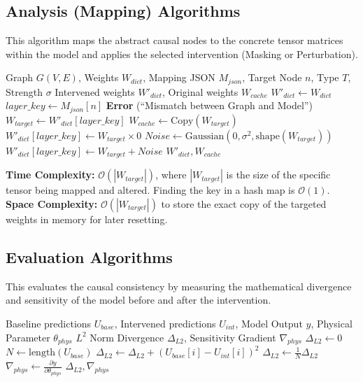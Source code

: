 \documentclass[12pt,singleside,a4paper]{article}
\begin{document}
\subsection{Analysis (Mapping) Algorithms}
This algorithm maps the abstract causal nodes to the concrete tensor matrices within the model and applies the selected intervention (Masking or Perturbation).

\begin{algorithm}[H]
\caption{Map and Intervene (Apply-Intervention)}
\begin{algorithmic}[1]
\Require Graph $G(V,E)$, Weights $W_{dict}$, Mapping JSON $M_{json}$, Target Node $n$, Type $T$, Strength $\sigma$
\Ensure Intervened weights $W'_{dict}$, Original weights $W_{cache}$
\State $W'_{dict} \gets W_{dict}$ 
\State $layer\_key \gets M_{json}[n]$
    \State \Return \textbf{Error} (``Mismatch between Graph and Model'')
\EndIf
\State $W_{target} \gets W'_{dict}[layer\_key]$
\State $W_{cache} \gets \text{Copy}(W_{target})$ 
    \State $W'_{dict}[layer\_key] \gets W_{target} \times 0$
    \State $Noise \gets \text{Gaussian}(0, \sigma^2, \text{shape}(W_{target}))$
    \State $W'_{dict}[layer\_key] \gets W_{target} + Noise$
\EndIf
\State \Return $W'_{dict}, W_{cache}$
\end{algorithmic}
\end{algorithm}

\textbf{Time Complexity:} $\mathcal{O}(|W_{target}|)$, where $|W_{target}|$ is the size of the specific tensor being mapped and altered. Finding the key in a hash map is $\mathcal{O}(1)$. \\
\textbf{Space Complexity:} $\mathcal{O}(|W_{target}|)$ to store the exact copy of the targeted weights in memory for later resetting.
\subsection{Evaluation Algorithms}
This evaluates the causal consistency by measuring the mathematical divergence and sensitivity of the model before and after the intervention.

\begin{algorithm}[H]
\caption{Evaluate Sensitivity Consistency (Compute-Metrics)}
\begin{algorithmic}[1]
\Require Baseline predictions $U_{base}$, Intervened predictions $U_{int}$, Model Output $y$, Physical Parameter $\theta_{phys}$
\Ensure $L^2$ Norm Divergence $\Delta_{L2}$, Sensitivity Gradient $\nabla_{phys}$
\State $\Delta_{L2} \gets 0$
\State $N \gets \text{length}(U_{base})$
    \State $\Delta_{L2} \gets \Delta_{L2} + (U_{base}[i] - U_{int}[i])^2$
\EndFor
\State $\Delta_{L2} \gets \frac{1}{N} \Delta_{L2}$
\State $\nabla_{phys} \gets \frac{\partial y}{\partial \theta_{phys}}$ 
\State \Return $\Delta_{L2}, \nabla_{phys}$
\end{algorithmic}
\end{algorithm}
\end{document}
